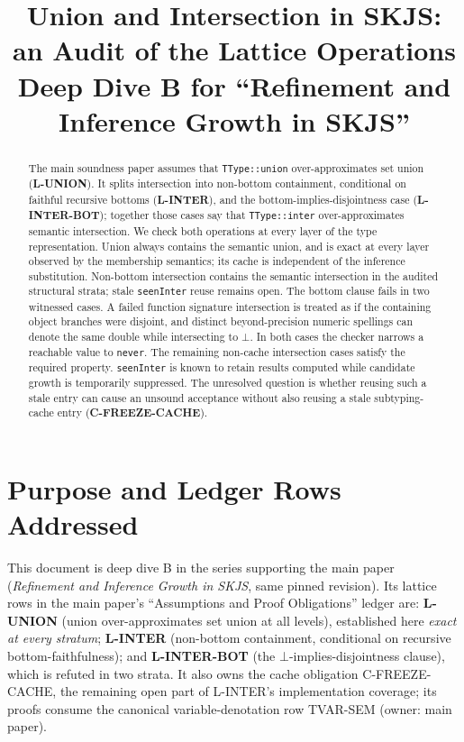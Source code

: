 \documentclass[11pt]{article}
\title{Union and Intersection in SKJS:\\
an Audit of the Lattice Operations\\
{\large Deep Dive B for ``Refinement and Inference Growth in SKJS''}}
\author{}
\date{\skjspin}
\begin{document}
\maketitle

\begin{abstract}
The main soundness paper assumes that \texttt{TType::union}
over-approximates set union (\textbf{L-UNION}). It splits intersection
into non-bottom containment, conditional on faithful recursive bottoms
(\textbf{L-INTER}), and the bottom-implies-disjointness case
(\textbf{L-INTER-BOT}); together those cases say that
\texttt{TType::inter} over-approximates semantic intersection.
We check both operations at every layer of the type representation. Union
always contains the semantic union, and is exact at every layer observed by
the membership semantics; its cache is independent of the inference
substitution. Non-bottom intersection contains the semantic intersection in
the audited structural strata; stale \texttt{seenInter} reuse remains open.
The bottom clause fails in two witnessed cases. A failed function
signature intersection is treated as if the containing object branches were
disjoint, and distinct beyond-precision numeric spellings can denote the same
double while intersecting to $\bot$. In both cases the checker narrows a
reachable value to \texttt{never}. The remaining non-cache intersection cases
satisfy the required property. \texttt{seenInter} is known to retain results
computed while candidate growth is temporarily suppressed. The unresolved
question is whether reusing such a stale entry can cause an unsound acceptance
without also reusing a stale subtyping-cache entry
(\textbf{C-FREEZE-CACHE}).
\end{abstract}

\tableofcontents

\section{Purpose and Ledger Rows Addressed}
\label{sec:purpose}

This document is deep dive B in the series supporting the main paper
(\emph{Refinement and Inference Growth in SKJS}, same pinned revision).
Its lattice rows in the main paper's ``Assumptions and Proof
Obligations'' ledger are: \textbf{L-UNION} (union over-approximates set
union at all levels), established here \emph{exact at every stratum};
\textbf{L-INTER} (non-bottom containment, conditional on recursive
bottom-faithfulness); and
\textbf{L-INTER-BOT} (the $\bot$-implies-disjointness clause), which
is refuted in two strata. It also owns the cache obligation
C-FREEZE-CACHE, the remaining open part of L-INTER's implementation
coverage; its
proofs consume the canonical variable-denotation row TVAR-SEM (owner:
main paper).
\end{document}
